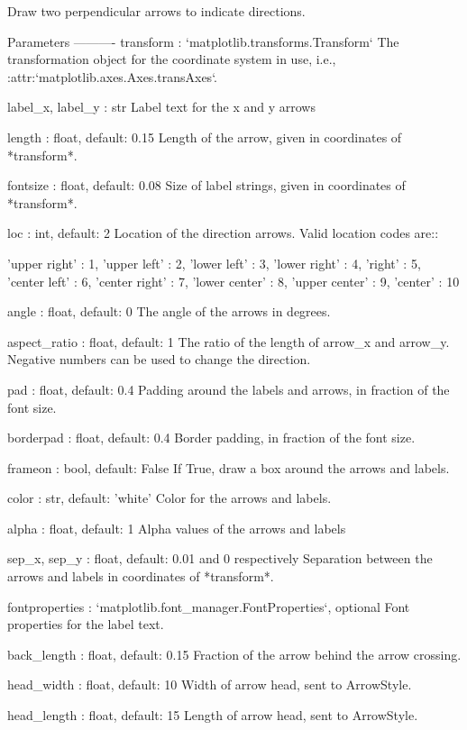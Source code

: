 \begin{DoxyVerb}Draw two perpendicular arrows to indicate directions.

Parameters
----------
transform : `matplotlib.transforms.Transform`
    The transformation object for the coordinate system in use, i.e.,
    :attr:`matplotlib.axes.Axes.transAxes`.

label_x, label_y : str
    Label text for the x and y arrows

length : float, default: 0.15
    Length of the arrow, given in coordinates of *transform*.

fontsize : float, default: 0.08
    Size of label strings, given in coordinates of *transform*.

loc : int, default: 2
    Location of the direction arrows. Valid location codes are::

'upper right'  : 1,
'upper left'   : 2,
'lower left'   : 3,
'lower right'  : 4,
'right'        : 5,
'center left'  : 6,
'center right' : 7,
'lower center' : 8,
'upper center' : 9,
'center'       : 10

angle : float, default: 0
    The angle of the arrows in degrees.

aspect_ratio : float, default: 1
    The ratio of the length of arrow_x and arrow_y.
    Negative numbers can be used to change the direction.

pad : float, default: 0.4
    Padding around the labels and arrows, in fraction of the font size.

borderpad : float, default: 0.4
    Border padding, in fraction of the font size.

frameon : bool, default: False
    If True, draw a box around the arrows and labels.

color : str, default: 'white'
    Color for the arrows and labels.

alpha : float, default: 1
    Alpha values of the arrows and labels

sep_x, sep_y : float, default: 0.01 and 0 respectively
    Separation between the arrows and labels in coordinates of
    *transform*.

fontproperties : `matplotlib.font_manager.FontProperties`, optional
    Font properties for the label text.

back_length : float, default: 0.15
    Fraction of the arrow behind the arrow crossing.

head_width : float, default: 10
    Width of arrow head, sent to ArrowStyle.

head_length : float, default: 15
    Length of arrow head, sent to ArrowStyle.


\end{DoxyVerb}

